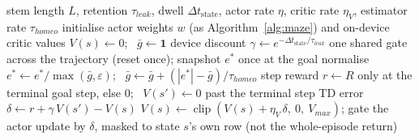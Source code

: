 \begin{algorithm}[htbp!]
\caption{Device-native temporal-difference (actor--critic) rule (Figure~\ref{fig:8h}).}
\label{alg:devtd}
\begin{algorithmic}[1]
\Require stem length $L$, retention $\tau_{leak}$, dwell $\Delta t_{\text{state}}$, actor rate $\eta$, critic rate $\eta_V$, estimator rate $\tau_{homeo}$
\State initialise actor weights $w$ (as Algorithm~\ref{alg:maze}) and on-device critic values $V(s) \gets 0$; \ $\bar g \gets \mathbf{1}$
\State device discount $\gamma \gets e^{-\Delta t_{\text{state}}/\tau_{leak}}$ \quad{}
    \State one shared gate across the trajectory (reset once); snapshot $e^{\ast}$ once at the goal
    \State normalise $e^{\ast} \gets e^{\ast}/\max(\bar g,\varepsilon)$; \ $\bar g \gets \bar g + (|e^{\ast}| - \bar g)/\tau_{homeo}$ 
        \State step reward $r \gets R$ only at the terminal goal step, else $0$; \ $V(s')\gets 0$ past the terminal step
        \State TD error $\delta \gets r + \gamma\,V(s') - V(s)$
        \State $V(s) \gets \operatorname{clip}(V(s) + \eta_V\,\delta,\ 0,\ V_{max})$; \quad gate the actor update by $\delta$, masked to state $s$'s own row (not the whole-episode return)
    \EndFor
\EndFor
\end{algorithmic}
\end{algorithm}

\FloatBarrier
